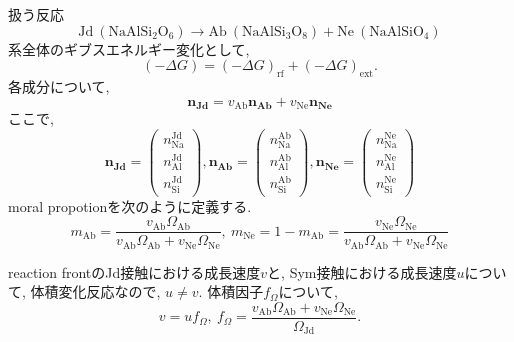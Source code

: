 \documentclass[a4paper,12pt]{jsarticle}
\begin{document}
扱う反応
\begin{equation*}
\text{Jd}~(\text{NaAlSi}_2\text{O}_6) \to \text{Ab}~(\text{NaAlSi}_3\text{O}_8) + \text{Ne}~(\text{NaAlSiO}_4)
\end{equation*}
系全体のギブスエネルギー変化として, 
\begin{equation*}
(-\Delta G) = (-\Delta G)_{\text{rf}} + (-\Delta G)_{\text{ext}}.
\end{equation*}
各成分について, 
\begin{equation*}
 \bm{n_{\text{Jd}}} = v_{\text{Ab}}\bm{n_{\text{Ab}}} + v_{\text{Ne}}\bm{n_{\text{Ne}}}
\end{equation*}
ここで, 
\begin{equation*}
 \bm{n_{\text{Jd}}} = \begin{pmatrix}
		       n_{\text{Na}}^{\text{Jd}}\\ n_{\text{Al}}^{\text{Jd}}\\ n_{\text{Si}}^{\text{Jd}}
		      \end{pmatrix}, 
 \bm{n_{\text{Ab}}} = \begin{pmatrix}
		       n_{\text{Na}}^{\text{Ab}}\\ n_{\text{Al}}^{\text{Ab}}\\ n_{\text{Si}}^{\text{Ab}}
		      \end{pmatrix}, 
 \bm{n_{\text{Ne}}} = \begin{pmatrix}
		       n_{\text{Na}}^{\text{Ne}}\\ n_{\text{Al}}^{\text{Ne}}\\ n_{\text{Si}}^{\text{Ne}}
		      \end{pmatrix}
\end{equation*}
moral propotionを次のように定義する. 
\begin{equation*}
 m_{\text{Ab}} = \dfrac{v_{\text{Ab}} \Omega_{\text{Ab}}}{v_{\text{Ab}} \Omega_{\text{Ab}} + v_{\text{Ne}} \Omega_{\text{Ne}}},\ m_{\text{Ne}} = 1 - m_{\text{Ab}} = \dfrac{v_{\text{Ne}} \Omega_{\text{Ne}}}{v_{\text{Ab}} \Omega_{\text{Ab}} + v_{\text{Ne}} \Omega_{\text{Ne}}}
\end{equation*}

reaction frontのJd接触における成長速度$v$と, Sym接触における成長速度$u$について, 体積変化反応なので, $u \neq v$. 
体積因子$f_{\Omega}$について,  
\begin{equation*}
 v =u f_{\Omega},\ f_{\Omega} = \dfrac{v_{\text{Ab}} \Omega_{\text{Ab}} + v_{\text{Ne}} \Omega_{\text{Ne}}}{\Omega_{\text{Jd}}}.
\end{equation*}
\end{document}
